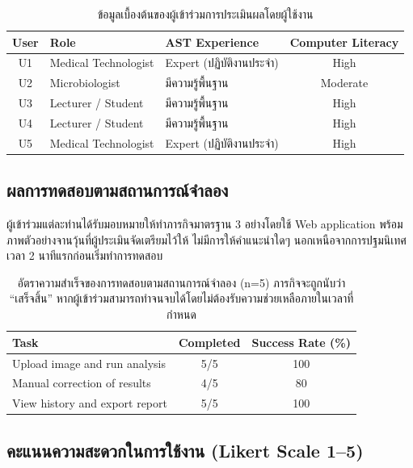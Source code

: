 \begin{table}[H]
  \centering
  \caption{ข้อมูลเบื้องต้นของผู้เข้าร่วมการประเมินผลโดยผู้ใช้งาน}
  \label{tab:user_profile}
  \begin{tabular}{cllc}
    \toprule
    \textbf{User} & \textbf{Role} & \textbf{AST Experience} & \textbf{Computer Literacy} \\
    \midrule
    U1 & Medical Technologist & Expert (ปฏิบัติงานประจำ) & High \\
    U2 & Microbiologist        & มีความรู้พื้นฐาน          & Moderate \\
    U3 & Lecturer / Student    & มีความรู้พื้นฐาน          & High \\
    U4 & Lecturer / Student    & มีความรู้พื้นฐาน          & High \\
    U5 & Medical Technologist  & Expert (ปฏิบัติงานประจำ) & High \\
    \bottomrule
  \end{tabular}
\end{table}

\subsection{ผลการทดสอบตามสถานการณ์จำลอง}

ผู้เข้าร่วมแต่ละท่านได้รับมอบหมายให้ทำภารกิจมาตรฐาน 3 อย่างโดยใช้ Web application พร้อมภาพตัวอย่างจานวุ้นที่ผู้ประเมินจัดเตรียมไว้ให้ ไม่มีการให้คำแนะนำใดๆ นอกเหนือจากการปฐมนิเทศเวลา 2 นาทีแรกก่อนเริ่มทำการทดสอบ

\begin{table}[H]
  \centering
  \caption{อัตราความสำเร็จของการทดสอบตามสถานการณ์จำลอง (n=5)
           ภารกิจจะถูกนับว่า ``เสร็จสิ้น'' หากผู้เข้าร่วมสามารถทำจนจบได้โดยไม่ต้องรับความช่วยเหลือภายในเวลาที่กำหนด}
  \label{tab:scenario}
  \begin{tabular}{lcc}
    \toprule
    \textbf{Task} & \textbf{Completed} & \textbf{Success Rate (\%)} \\
    \midrule
    Upload image and run analysis      & 5/5 & 100 \\
    Manual correction of results       & 4/5 & 80  \\
    View history and export report     & 5/5 & 100 \\
    \bottomrule
  \end{tabular}
\end{table}

\subsection{คะแนนความสะดวกในการใช้งาน (Likert Scale 1--5)}

